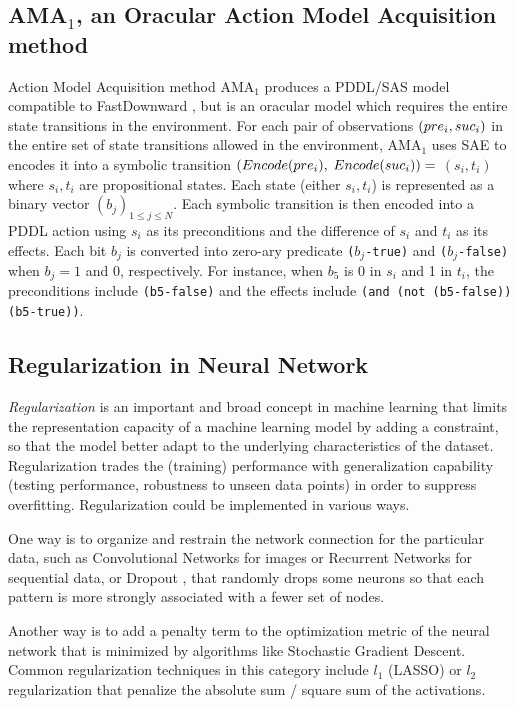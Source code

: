 \subsection{AMA$_1$, an Oracular Action Model Acquisition method}

Action Model Acquisition method AMA$_1$ produces a PDDL/SAS model compatible to
FastDownward \cite{Helmert04}, but is an oracular model which requires the entire state transitions
in the environment.
For each pair of observations ${\left(pre_i, suc_i\right)}$ in the entire set of state transitions allowed in the environment,
AMA$_1$ uses SAE to encodes it into 
a symbolic transition $(Encode(pre_i),$ $Encode(suc_i))=$ $(s_i,t_i)$ where $s_i,t_i$ are propositional states.
Each state (either $s_i,t_i$) is represented as a binary vector $(b_j)_{1\leq j \leq N}$.
Each symbolic transition is then encoded into a PDDL action 
using $s_i$ as its preconditions and the difference of $s_i$ and $t_i$ as its effects.
Each bit $b_j$ is converted into zero-ary predicate \texttt{($b_j$-true)} and \texttt{($b_j$-false)}
when $b_j=1$ and $0$, respectively.
For instance, when $b_5$ is 0 in $s_i$ and 1 in $t_i$,
the preconditions include \texttt{(b5-false)} and
the effects include \texttt{(and (not (b5-false)) (b5-true))}.

\subsection{Regularization in Neural Network}

\emph{Regularization} is an important and broad concept in machine learning
that limits the representation capacity of a machine learning model by adding a constraint,
so that the model better adapt to the underlying characteristics of the dataset.
Regularization trades the (training) performance with generalization capability (testing performance, robustness to
unseen data points) in order to suppress overfitting.
Regularization could be implemented in various ways.

One way is to organize and restrain the network connection for the particular data,
such as Convolutional Networks for images
or Recurrent Networks for sequential data, or
Dropout \cite{srivastava2014dropout}, that randomly drops some neurons so
that each pattern is more strongly associated with a fewer set of nodes.

Another way is to add a penalty term to the optimization metric of the
neural network that is minimized by algorithms like Stochastic
Gradient Descent.
Common regularization techniques in this category include
$l_1$ (LASSO) or $l_2$ regularization that penalize the absolute sum / square sum of the
activations.

